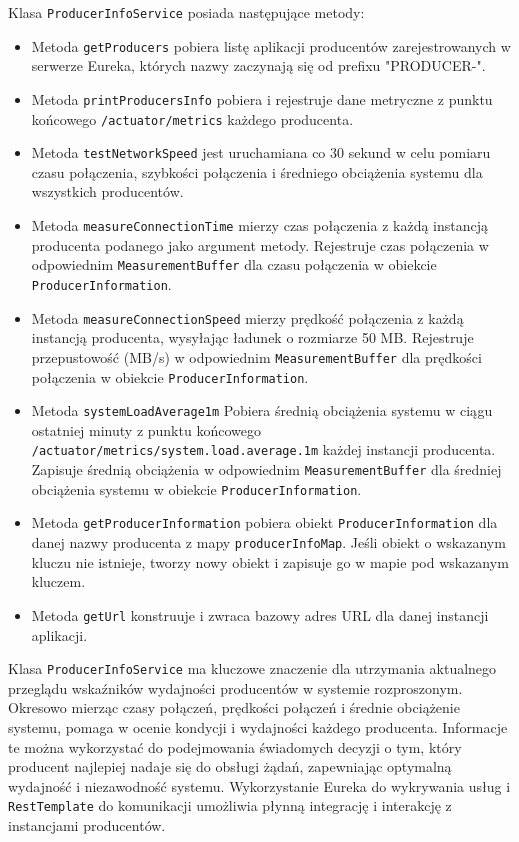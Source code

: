 Klasa \verb|ProducerInfoService| posiada następujące metody:
\begin{itemize}
    \item Metoda \verb|getProducers| pobiera listę aplikacji producentów zarejestrowanych w serwerze Eureka, których nazwy zaczynają się od prefixu "PRODUCER-".
    \item Metoda \verb|printProducersInfo| pobiera i rejestruje dane metryczne z punktu końcowego \verb|/actuator/metrics| każdego producenta.
    \item Metoda \verb|testNetworkSpeed| jest uruchamiana co 30 sekund w celu pomiaru czasu połączenia, szybkości połączenia i średniego obciążenia systemu dla wszystkich producentów.
    \item Metoda \verb|measureConnectionTime| mierzy czas połączenia z każdą instancją producenta podanego jako argument metody. Rejestruje czas połączenia w odpowiednim \verb|MeasurementBuffer| dla czasu połączenia w obiekcie \verb|ProducerInformation|.
    \item Metoda \verb|measureConnectionSpeed| mierzy prędkość połączenia z każdą instancją producenta, wysyłając ładunek o rozmiarze 50 MB. Rejestruje przepustowość (MB/s) w odpowiednim \verb|MeasurementBuffer| dla prędkości połączenia w obiekcie \verb|ProducerInformation|.
    \item Metoda \verb|systemLoadAverage1m| Pobiera średnią obciążenia systemu w ciągu ostatniej minuty z punktu końcowego \verb|/actuator/metrics/system.load.average.1m| każdej instancji producenta. Zapisuje średnią obciążenia w odpowiednim \verb|MeasurementBuffer| dla średniej obciążenia systemu w obiekcie \verb|ProducerInformation|.
    \item Metoda \verb|getProducerInformation| pobiera obiekt \verb|ProducerInformation| dla danej nazwy producenta z mapy \verb|producerInfoMap|. Jeśli obiekt o wskazanym kluczu nie istnieje, tworzy nowy obiekt i zapisuje go w mapie pod wskazanym kluczem.
    \item Metoda \verb|getUrl| konstruuje i zwraca bazowy adres URL dla danej instancji aplikacji.
\end{itemize}

Klasa \verb|ProducerInfoService| ma kluczowe znaczenie dla utrzymania aktualnego przeglądu wskaźników wydajności producentów w systemie rozproszonym. Okresowo mierząc czasy połączeń, prędkości połączeń i średnie obciążenie systemu, pomaga w ocenie kondycji i wydajności każdego producenta. Informacje te można wykorzystać do podejmowania świadomych decyzji o tym, który producent najlepiej nadaje się do obsługi żądań, zapewniając optymalną wydajność i niezawodność systemu. Wykorzystanie Eureka do wykrywania usług i \verb|RestTemplate| do komunikacji  umożliwia płynną integrację i interakcję z instancjami producentów.

